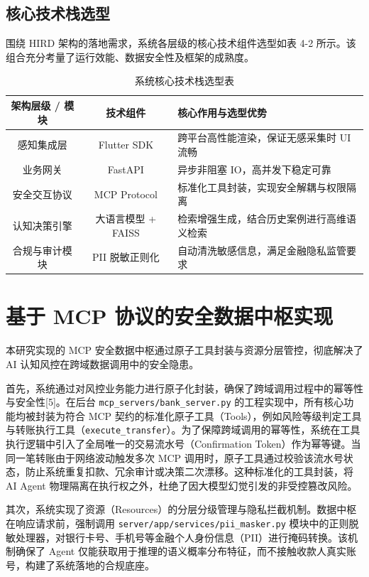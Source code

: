 \documentclass[twoside,openright]{xduugthesis}
\begin{document}
\subsection{核心技术栈选型}

围绕 HIRD 架构的落地需求，系统各层级的核心技术组件选型如表 4-2 所示。该组合充分考量了运行效能、数据安全性及框架的成熟度。

\begin{table}[H]
    \centering
    \caption{系统核心技术栈选型表}
    \label{tab:tech-stack}
    \begin{tabular}{|c|c|p{7cm}|}
        \hline
        架构层级 / 模块 & 技术组件 & 核心作用与选型优势 \\
        \hline
        感知集成层  & Flutter SDK & 跨平台高性能渲染，保证无感采集时 UI 流畅 \\
        \hline
        业务网关  & FastAPI & 异步非阻塞 IO，高并发下稳定可靠 \\
        \hline
        安全交互协议 & MCP Protocol & 标准化工具封装，实现安全解耦与权限隔离 \\
        \hline
        认知决策引擎 & 大语言模型 + FAISS & 检索增强生成，结合历史案例进行高维语义检索 \\
        \hline
        合规与审计模块 & PII 脱敏正则化 & 自动清洗敏感信息，满足金融隐私监管要求 \\
        \hline
    \end{tabular}
\end{table}

\section{基于 MCP 协议的安全数据中枢实现}

本研究实现的 MCP 安全数据中枢通过原子工具封装与资源分层管控，彻底解决了 AI 认知风控在跨域数据调用中的安全隐患。

首先，系统通过对风控业务能力进行原子化封装，确保了跨域调用过程中的幂等性与安全性[5]。在后台 \texttt{mcp\_servers/bank\_server.py} 的工程实现中，所有核心功能均被封装为符合 MCP 契约的标准化原子工具（Tools），例如风险等级判定工具与转账执行工具（\texttt{execute\_transfer}）。为了保障跨域调用的幂等性，系统在工具执行逻辑中引入了全局唯一的交易流水号（Confirmation Token）作为幂等键。当同一笔转账由于网络波动触发多次 MCP 调用时，原子工具通过校验该流水号状态，防止系统重复扣款、冗余审计或决策二次漂移。这种标准化的工具封装，将 AI Agent 物理隔离在执行权之外，杜绝了因大模型幻觉引发的非受控篡改风险。

其次，系统实现了资源（Resources）的分层分级管理与隐私拦截机制。数据中枢在响应请求前，强制调用 \texttt{server/app/services/pii\_masker.py} 模块中的正则脱敏处理器，对银行卡号、手机号等金融个人身份信息（PII）进行掩码转换。该机制确保了 Agent 仅能获取用于推理的语义概率分布特征，而不接触收款人真实账号，构建了系统落地的合规底座。
\end{document}
